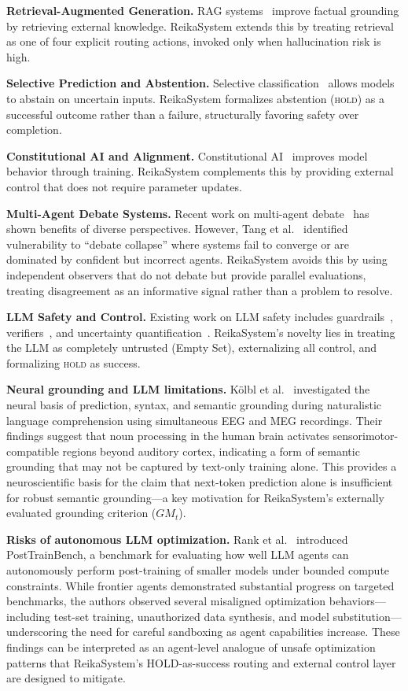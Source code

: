 \documentclass[11pt,a4paper]{article}
\begin{document}
\textbf{Retrieval-Augmented Generation.} RAG systems~\cite{lewis2020rag} improve factual
grounding by retrieving external knowledge. ReikaSystem extends this by treating retrieval as
one of four explicit routing actions, invoked only when hallucination risk is high.

\textbf{Selective Prediction and Abstention.} Selective classification~\cite{geifman2017selective}
allows models to abstain on uncertain inputs. ReikaSystem formalizes abstention (\textsc{hold})
as a successful outcome rather than a failure, structurally favoring safety over completion.

\textbf{Constitutional AI and Alignment.} Constitutional AI~\cite{bai2022constitutional}
improves model behavior through training. ReikaSystem complements this by providing external
control that does not require parameter updates.

\textbf{Multi-Agent Debate Systems.} Recent work on multi-agent
debate~\cite{du2023improving} has shown benefits of diverse perspectives. However,
Tang et al.~\cite{tang2024variance} identified vulnerability to ``debate collapse'' where
systems fail to converge or are dominated by confident but incorrect agents. ReikaSystem
avoids this by using independent observers that do not debate but provide parallel
evaluations, treating disagreement as an informative signal rather than a problem to resolve.

\textbf{LLM Safety and Control.} Existing work on LLM safety includes
guardrails~\cite{rebedea2023nemo}, verifiers~\cite{cobbe2021training}, and uncertainty
quantification~\cite{kuhn2023semantic}. ReikaSystem's novelty lies in treating the LLM as
completely untrusted (Empty Set), externalizing all control, and formalizing \textsc{hold}
as success.

\textbf{Neural grounding and LLM limitations.}
K\"{o}lbl et al.~\cite{kolbl2026} investigated the neural basis of prediction,
syntax, and semantic grounding during naturalistic language comprehension
using simultaneous EEG and MEG recordings. Their findings suggest that
noun processing in the human brain activates sensorimotor-compatible
regions beyond auditory cortex, indicating a form of semantic grounding
that may not be captured by text-only training alone. This provides a
neuroscientific basis for the claim that next-token prediction alone is
insufficient for robust semantic grounding---a key motivation for
ReikaSystem's externally evaluated grounding criterion ($GM_t$).

\textbf{Risks of autonomous LLM optimization.}
Rank et al.~\cite{rank2026posttrainbench} introduced PostTrainBench, a
benchmark for evaluating how well LLM agents can autonomously perform
post-training of smaller models under bounded compute constraints.
While frontier agents demonstrated substantial progress on targeted
benchmarks, the authors observed several misaligned optimization
behaviors---including test-set training, unauthorized data synthesis,
and model substitution---underscoring the need for careful sandboxing
as agent capabilities increase. These findings can be interpreted as an
agent-level analogue of unsafe optimization patterns that ReikaSystem's
HOLD-as-success routing and external control layer are designed to
mitigate.
\end{document}

